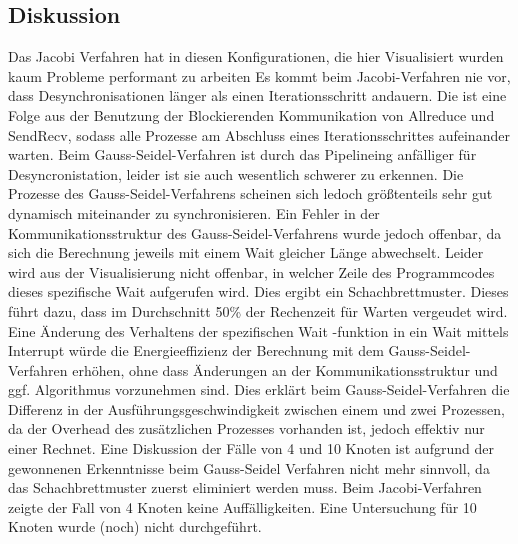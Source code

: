 \documentclass[a4paper,12pt]{scrartcl}
\begin{document}
\subsection{Diskussion}
Das Jacobi Verfahren hat in diesen Konfigurationen, die hier Visualisiert wurden kaum Probleme performant zu arbeiten Es kommt beim Jacobi-Verfahren nie vor, dass Desynchronisationen länger als einen Iterationsschritt andauern. Die ist eine Folge aus der Benutzung der Blockierenden Kommunikation von Allreduce und SendRecv, sodass alle Prozesse am Abschluss eines Iterationsschrittes aufeinander warten. 
Beim Gauss-Seidel-Verfahren ist durch das Pipelineing anfälliger für Desyncronistation, leider ist sie auch wesentlich schwerer zu erkennen. Die Prozesse des Gauss-Seidel-Verfahrens scheinen sich ledoch größtenteils sehr gut dynamisch miteinander zu synchronisieren.
Ein Fehler in der Kommunikationsstruktur des Gauss-Seidel-Verfahrens wurde jedoch offenbar, da sich die Berechnung jeweils mit einem Wait gleicher Länge abwechselt. Leider wird aus der Visualisierung nicht offenbar, in welcher Zeile des Programmcodes dieses spezifische Wait aufgerufen wird. Dies ergibt ein Schachbrettmuster. Dieses führt dazu, dass im Durchschnitt 50\% der Rechenzeit für Warten vergeudet wird. Eine Änderung des Verhaltens der spezifischen Wait -funktion in ein Wait mittels Interrupt würde die Energieeffizienz der Berechnung mit dem Gauss-Seidel-Verfahren erhöhen, ohne dass Änderungen an der Kommunikationsstruktur und ggf. Algorithmus vorzunehmen sind.  
Dies erklärt beim Gauss-Seidel-Verfahren die Differenz in der Ausführungsgeschwindigkeit zwischen einem und zwei Prozessen, da der Overhead des zusätzlichen Prozesses vorhanden ist, jedoch effektiv nur einer Rechnet.
Eine Diskussion der Fälle von 4 und 10 Knoten ist aufgrund der gewonnenen Erkenntnisse beim Gauss-Seidel Verfahren nicht mehr sinnvoll, da das Schachbrettmuster zuerst eliminiert werden muss. 
Beim Jacobi-Verfahren zeigte der Fall von 4 Knoten keine Auffälligkeiten. Eine Untersuchung für 10 Knoten wurde (noch) nicht durchgeführt.
\end{document}
